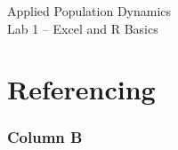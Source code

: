 \documentclass[color=usenames,dvipsnames]{beamer}\usepackage[]{graphicx}\usepackage[]{color}
\begin{document}
\begin{frame}[plain]
  \huge
  \begin{center}
    \huge Applied Population Dynamics \\
    \LARGE Lab 1 -- Excel and R Basics \\
    \vspace{.5cm}
  \end{center}
\end{frame}


\section{Referencing}


\begin{frame}
  \frametitle{Column B}
\end{frame}
\end{document}
